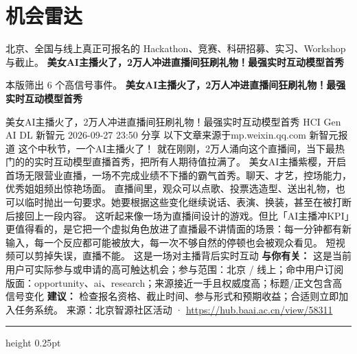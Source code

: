 \documentclass[10.5pt]{ctexart}
\begin{document}
\section*{机会雷达}
{\color{ormuted} 北京、全国与线上真正可报名的 Hackathon、竞赛、科研招募、实习、Workshop 与截止。}
\vspace{2mm}
{\LARGE\bfseries 美女AI主播火了，2万人冲进直播间狂刷礼物！最强实时互动模型首秀}\par
\vspace{1mm}
{\color{ormuted} 本版筛出 6 个高信号事件。}
\vspace{3mm}
{\Large\bfseries 美女AI主播火了，2万人冲进直播间狂刷礼物！最强实时互动模型首秀}\par
美女AI主播火了，2万人冲进直播间狂刷礼物！最强实时互动模型首秀 HCI Gen AI DL 新智元 2026-09-27 23:50 分享 以下文章来源于mp.weixin.qq.com 新智元报道 这个中秋节，一个AI主播火了！ 就在刚刚，2万人涌向这个直播间，当下最热门的的实时互动模型直播首秀，把所有人期待值拉满了。 美女AI主播紫樱，开启首场无限营业直播，一场不完成业绩不下播的霸气首秀。聊天、才艺，控场能力，优秀姐姐频出惊艳场面。 直播间里，观众可以点歌、投票选造型、送出礼物，也可以临时抛出一句要求。她要根据这些变化继续说话、表演、换装，甚至在被打断后接回上一段内容。 这听起来像一场为直播间设计的游戏。但比「AI主播冲KPI」更值得看的，是它把一个虚拟角色放进了直播最不讲情面的场景：每一分钟都有新输入，每一个反应都可能被放大，每一次不够自然的停顿也会被观众看见。 短视频可以剪掉失误，直播不能。 这是一场对主播背后实时互动
\textbf{与你有关：} 这是当前用户可实际参与或申请的高可触达机会；参与范围：北京 / 线上；命中用户订阅版面：opportunity、ai、research；来源接近一手且权威度高；标题/正文包含高信号变化
\textbf{建议：} 检查报名资格、截止时间、参与形式和预期收益；合适则立即加入任务系统。
{\footnotesize\color{ormuted} 来源：北京智源社区活动 · \url{https://hub.baai.ac.cn/view/58311}}
\vspace{4mm}
\hrule height 0.25pt
\vspace{3mm}
\end{document}
